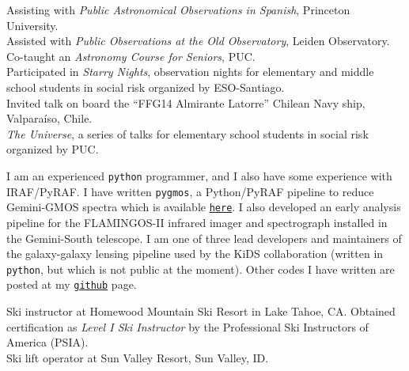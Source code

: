 \documentclass[11pt]{article}
\begin{document}

\noindent
{} Assisting with \emph{Public Astronomical Observations in Spanish}, Princeton University.\\
 Assisted with \emph{Public Observations at the Old Observatory}, Leiden Observatory.\\
 Co-taught an \emph{Astronomy Course for Seniors}, PUC.\\
 Participated in \emph{Starry Nights}, observation nights for elementary and middle school students in social risk organized by ESO-Santiago.\\
 Invited talk on board the ``FFG14 Almirante Latorre'' Chilean Navy ship, Valpara\'iso, Chile.\\
 \emph{The Universe}, a series of talks for elementary school students in social risk organized by PUC.\\



I am an experienced \texttt{python} programmer, and I also have some experience with IRAF/PyRAF. I have written {\tt pygmos}, a Python/PyRAF pipeline to reduce Gemini-GMOS spectra which is available \href{https://github.com/cristobal-sifon/pygmos/}{\texttt{here}}. I also developed an early analysis pipeline for the FLAMINGOS-II infrared imager and spectrograph installed in the Gemini-South telescope. I am one of three lead developers and maintainers of the galaxy-galaxy lensing pipeline used by the KiDS collaboration (written in \texttt{python}, but which is not public at the moment). Other codes I have written are posted at my \href{https://github.com/cristobal-sifon}{\texttt{github}} page.\\


\hline
\vspace{0.5cm}
\pagebreak



\noindent
{} Ski instructor at Homewood Mountain Ski Resort in Lake Tahoe, CA. Obtained certification as \emph{Level I Ski Instructor} by the Professional Ski Instructors of America (PSIA).\\
 Ski lift operator at Sun Valley Resort, Sun Valley, ID.\\


\end{document}
